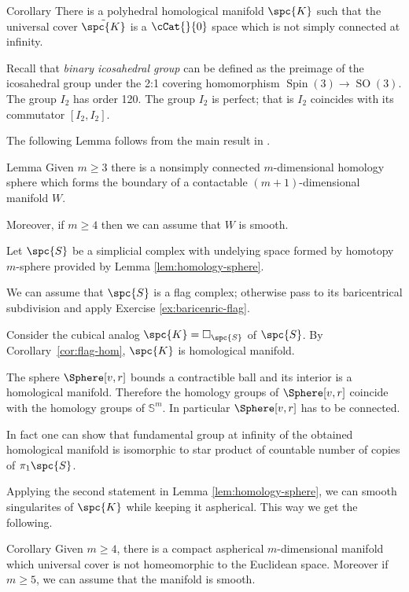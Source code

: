 \begin{thm}{Corollary}
There is a polyhedral homological manifold $\spc{K}$
such that the universal cover $\tilde{\spc{K}}$ 
is a $\cCat{}{0}$ space which is not simply connected at infinity.
\end{thm}

Recall that \emph{binary icosahedral group} can be defined as the preimage of the icosahedral group under the 2:1 covering homomorphism
$\operatorname{Spin}(3) \to \operatorname{SO}(3)$.
The group $I_2$ has order 120.
The group $I_2$ is perfect; that is $I_2$ coincides with its commutator $[I_2,I_2]$.

The following Lemma follows from the main result in \cite{kervaire}.

\begin{thm}{Lemma}\label{lem:homology-sphere}
Given $m\ge 3$ there is a nonsimply connected $m$-dimensional homology sphere which forms the boundary of a contactable $(m+1)$-dimensional manifold $W$.

Moreover, if $m\ge 4$ then we can assume that $W$ is smooth.
\end{thm}

Let $\spc{S}$ be a simplicial complex 
with undelying space formed by homotopy $m$-sphere provided by Lemma \ref{lem:homology-sphere}.

We can assume that $\spc{S}$ is a flag complex;
otherwise pass to its baricentrical subdivision and apply Exercise \ref{ex:baricenric-flag}.

Consider the cubical analog $\spc{K}=\square_{\spc{S}}$ of $\spc{S}$.
By Corollary~\ref{cor:flag-hom}, $\spc{K}$ is homological manifold.

The sphere $\Sphere[v,r]$ bounds a contractible ball 
and its interior is a homological manifold.
Therefore the homology groups of $\Sphere[v,r]$
coincide with the homology groups of $\mathbb{S}^m$.
In particular $\Sphere[v,r]$ has to be connected.
\qeds

In fact one can show that fundamental group at infinity
of the obtained homological manifold is isomorphic to 
star product of countable number of copies of $\pi_1\spc{S}$.

Applying the second statement in Lemma \ref{lem:homology-sphere},
we can smooth singularites of $\spc{K}$ while keeping it aspherical.
This way we get the following.

\begin{thm}{Corollary}
Given $m\ge 4$,
there is a compact aspherical $m$-dimensional manifold 
which universal cover is not homeomorphic to the Euclidean space.
Moreover if $m\ge 5$, we can assume that the manifold is smooth.
\end{thm}
























